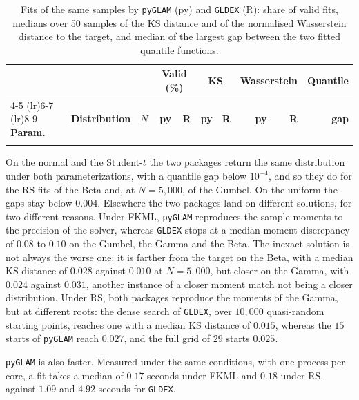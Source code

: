 \begin{table}[htbp]
\centering
\caption{Fits of the same samples by \texttt{pyGLAM} (py) and \texttt{GLDEX} (R):
share of valid fits, medians over 50 samples of the KS distance and of the
normalised Wasserstein distance to the target, and median of the largest gap
between the two fitted quantile functions.}
\label{tab:r_fits}
\footnotesize
\setlength{\tabcolsep}{3.5pt}
\begin{tabular}{llrrrrrrrr}
\toprule
& & & \multicolumn{2}{c}{\textbf{Valid (\%)}} & \multicolumn{2}{c}{\textbf{KS}} &
\multicolumn{2}{c}{\textbf{Wasserstein}} & \textbf{Quantile} \\
\cmidrule(lr){4-5} \cmidrule(lr){6-7} \cmidrule(lr){8-9}
\textbf{Param.} & \textbf{Distribution} & \textbf{$N$} & \textbf{py} & \textbf{R} &
\textbf{py} & \textbf{R} & \textbf{py} & \textbf{R} & \textbf{gap} \\
\midrule
\unskip \\
\bottomrule
\end{tabular}
\end{table}

On the normal and the Student-$t$ the two packages return the same distribution
under both parameterizations, with a quantile gap below $10^{-4}$, and so they
do for the RS fits of the Beta and, at $N = 5{,}000$, of the Gumbel. On the
uniform the gaps stay below $0.004$. Elsewhere the two packages land on different
solutions, for two different reasons. Under FKML, \texttt{pyGLAM} reproduces the
sample moments to the precision of the solver, whereas \texttt{GLDEX} stops at a
median moment discrepancy of $0.08$ to $0.10$ on the Gumbel, the Gamma and the
Beta. The inexact solution is not always the worse one: it is farther from the
target on the Beta, with a median KS distance of $0.028$ against $0.010$ at
$N = 5{,}000$, but closer on the Gamma, with $0.024$ against $0.031$, another
instance of a closer moment match not being a closer distribution. Under RS,
both packages reproduce the moments of the Gamma, but at different roots: the
dense search of \texttt{GLDEX}, over $10{,}000$ quasi-random starting points,
reaches one with a median KS distance of $0.015$, whereas the $15$ starts of
\texttt{pyGLAM} reach $0.027$, and the full grid of $29$ starts $0.025$.

\texttt{pyGLAM} is also faster. Measured under the same conditions, with one
process per core, a fit takes a median of $0.17$ seconds under FKML and $0.18$
under RS, against $1.09$ and $4.92$ seconds for \texttt{GLDEX}.
